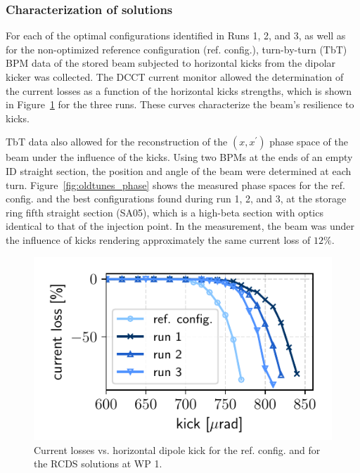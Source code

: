 \subsubsection{Characterization of solutions}
For each of the optimal configurations identified in Runs 1, 2, and 3, as well as for the non-optimized reference configuration (ref. config.), turn-by-turn (TbT) BPM data of the stored beam subjected to horizontal kicks from the dipolar kicker was collected. The DCCT current monitor allowed the determination of the current losses as a function of the horizontal kicks strengths, which is shown in Figure~\ref{fig:loss_kicks} for the three runs. These curves characterize the beam's resilience to kicks.

TbT data also allowed for the reconstruction of the $(x,x^\prime)$ phase space of the beam under the influence of the kicks. Using two BPMs at the ends of an empty ID straight section, the position and angle of the beam were determined at each turn. Figure~\ref{fig:oldtunes_phase} shows the measured phase spaces for the ref. config. and the best configurations found during run 1, 2, and 3, at the storage ring fifth straight section (SA05), which is a high-beta section with optics identical to that of the injection point. In the measurement, the beam was under the influence of kicks rendering approximately the same current loss of $12\%$.
\begin{figure}[tb]
    \centering
    \includegraphics[width=0.6\columnwidth]{Images/WEPL087_f1.pdf}
    \caption[Current losses vs. horizontal dipole kick for the ref. config. and for the RCDS solutions at WP 1.]{Current losses vs. horizontal dipole kick for the ref. config. and for the RCDS solutions at WP 1.}
       \label{fig:loss_kicks}
\end{figure}

